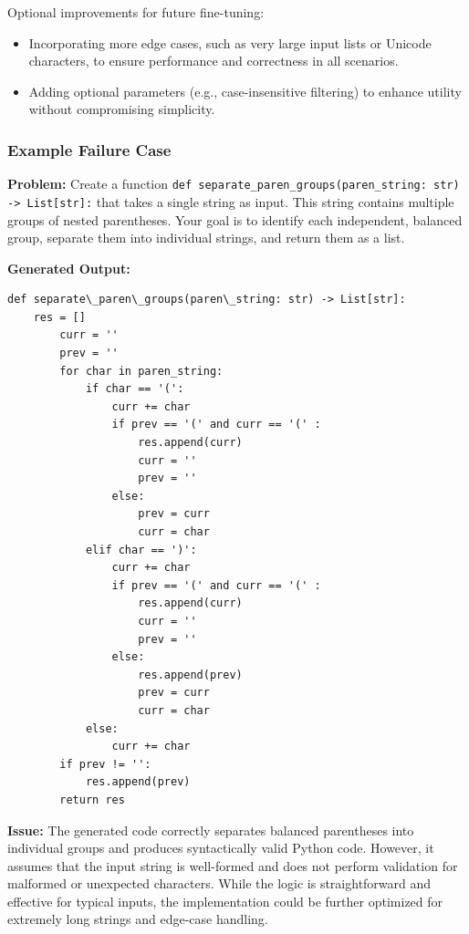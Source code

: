 Optional improvements for future fine-tuning:

\begin{itemize}
\item Incorporating more edge cases, such as very large input lists or Unicode characters, to ensure performance and correctness in all scenarios.
\item Adding optional parameters (e.g., case-insensitive filtering) to enhance utility without compromising simplicity.
\end{itemize}


\subsubsection{Example Failure Case}

\textbf{Problem:}
Create a function \texttt{def separate\_paren\_groups(paren\_string: str) -> List[str]:} 
that takes a single string as input. This string contains multiple groups of nested 
parentheses. Your goal is to identify each independent, balanced group, separate them 
into individual strings, and return them as a list.


\textbf{Generated Output:}
\begin{verbatim}
def separate\_paren\_groups(paren\_string: str) -> List[str]:
    res = []
        curr = ''
        prev = ''
        for char in paren_string:
            if char == '(':
                curr += char
                if prev == '(' and curr == '(' :
                    res.append(curr)
                    curr = ''
                    prev = ''
                else:
                    prev = curr
                    curr = char
            elif char == ')':
                curr += char
                if prev == '(' and curr == '(' :
                    res.append(curr)
                    curr = ''
                    prev = ''
                else:
                    res.append(prev)
                    prev = curr
                    curr = char
            else:
                curr += char
        if prev != '':
            res.append(prev)
        return res
\end{verbatim}

\textbf{Issue:} The generated code correctly separates balanced parentheses into individual groups and produces syntactically valid Python code. However, it assumes that the input string is well-formed and does not perform validation for malformed or unexpected characters. While the logic is straightforward and effective for typical inputs, the implementation could be further optimized for extremely long strings and edge-case handling.
